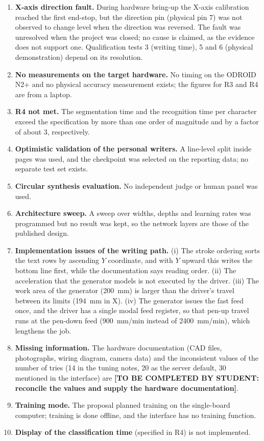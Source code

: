         \begin{enumerate}
          \item \textbf{X-axis direction fault.} During hardware bring-up the X-axis calibration reached the first end-stop, but the direction pin (physical pin 7) was not observed to change level when the direction was reversed.
          The fault was unresolved when the project was closed; no cause is claimed, as the evidence does not support one.
          Qualification tests 3 (writing time), 5 and 6 (physical demonstration) depend on its resolution.
          \item \textbf{No measurements on the target hardware.} No timing on the ODROID N2+ and no physical accuracy measurement exists; the figures for R3 and R4 are from a laptop.
          \item \textbf{R4 not met.} The segmentation time and the recognition time per character exceed the specification by more than one order of magnitude and by a factor of about 3, respectively.
          \item \textbf{Optimistic validation of the personal writers.} A line-level split inside pages was used, and the checkpoint was selected on the reporting data; no separate test set exists.
          \item \textbf{Circular synthesis evaluation.} No independent judge or human panel was used.
          \item \textbf{Architecture sweep.} A sweep over widths, depths and learning rates was programmed but no result was kept, so the network layers are those of the published design.
          \item \textbf{Implementation issues of the writing path.} (i) The stroke ordering sorts the text rows by ascending $Y$ coordinate, and with $Y$ upward this writes the bottom line first, while the documentation says reading order. (ii) The acceleration that the generator models is not executed by the driver. (iii) The work area of the generator (200~mm) is larger than the driver's travel between its limits (194~mm in X). (iv) The generator issues the fast feed once, and the driver has a single modal feed register, so that pen-up travel runs at the pen-down feed (900~mm/min instead of 2400~mm/min), which lengthens the job.
          \item \textbf{Missing information.} The hardware documentation (CAD files, photographs, wiring diagram, camera data) and the inconsistent values of the number of tries (14 in the tuning notes, 20 as the server default, 30 mentioned in the interface) are \textbf{[TO BE COMPLETED BY STUDENT: reconcile the values and supply the hardware documentation]}.
          \item \textbf{Training mode.} The proposal planned training on the single-board computer; training is done offline, and the interface has no training function.
          \item \textbf{Display of the classification time} (specified in R4) is not implemented.
        \end{enumerate}

